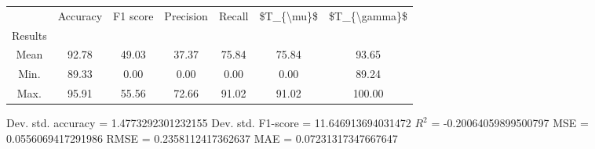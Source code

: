 \begin{tabular}{|c|c|c|c|c|c|c|}
\toprule
{} &  Accuracy &  F1 score &  Precision &  Recall &  \$T\_\{\textbackslash mu\}\$ &  \$T\_\{\textbackslash gamma\}\$ \\
Results &           &           &            &         &            &               \\
\hline
Mean    &     92.78 &     49.03 &      37.37 &   75.84 &      75.84 &         93.65 \\
Min.    &     89.33 &      0.00 &       0.00 &    0.00 &       0.00 &         89.24 \\
Max.    &     95.91 &     55.56 &      72.66 &   91.02 &      91.02 &        100.00 \\
\bottomrule
\end{tabular}

 Dev. std. accuracy = 1.4773292301232155
 Dev. std. F1-score = 11.646913694031472
 $R^2$ = -0.20064059899500797
 MSE = 0.0556069417291986
 RMSE = 0.2358112417362637
 MAE = 0.07231317347667647